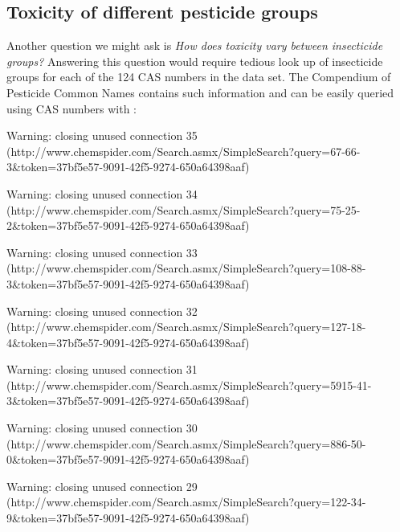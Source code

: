 \documentclass[article, shortnames]{jss}\usepackage[]{graphicx}\usepackage[]{color}
\begin{document}
\subsection[Toxicity of different pesticide groups]{Toxicity of different pesticide groups}
Another question we might ask is \emph{How does toxicity vary between insecticide groups?}
Answering this question would require tedious look up of insecticide groups for each of the 124 CAS numbers in the  data set.
The Compendium of Pesticide Common Names \citep{wood} contains such information and can be easily queried using CAS numbers with : 

\begin{CodeChunk}
\begin{CodeOutput}
Warning: closing unused connection 35 (http://www.chemspider.com/Search.asmx/SimpleSearch?query=67-66-3&token=37bf5e57-9091-42f5-9274-650a64398aaf)
\end{CodeOutput}
\begin{CodeOutput}
Warning: closing unused connection 34 (http://www.chemspider.com/Search.asmx/SimpleSearch?query=75-25-2&token=37bf5e57-9091-42f5-9274-650a64398aaf)
\end{CodeOutput}
\begin{CodeOutput}
Warning: closing unused connection 33 (http://www.chemspider.com/Search.asmx/SimpleSearch?query=108-88-3&token=37bf5e57-9091-42f5-9274-650a64398aaf)
\end{CodeOutput}
\begin{CodeOutput}
Warning: closing unused connection 32 (http://www.chemspider.com/Search.asmx/SimpleSearch?query=127-18-4&token=37bf5e57-9091-42f5-9274-650a64398aaf)
\end{CodeOutput}
\begin{CodeOutput}
Warning: closing unused connection 31 (http://www.chemspider.com/Search.asmx/SimpleSearch?query=5915-41-3&token=37bf5e57-9091-42f5-9274-650a64398aaf)
\end{CodeOutput}
\begin{CodeOutput}
Warning: closing unused connection 30 (http://www.chemspider.com/Search.asmx/SimpleSearch?query=886-50-0&token=37bf5e57-9091-42f5-9274-650a64398aaf)
\end{CodeOutput}
\begin{CodeOutput}
Warning: closing unused connection 29 (http://www.chemspider.com/Search.asmx/SimpleSearch?query=122-34-9&token=37bf5e57-9091-42f5-9274-650a64398aaf)

\end{CodeOutput}
\end{CodeChunk}
\end{document}
